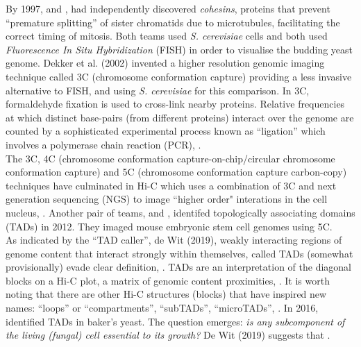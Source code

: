By 1997, \cite{guacci1997direct} and \cite{michaelis1997cohesins},
had independently discovered \textit{cohesins}, proteins that 
prevent ``premature splitting'' of sister chromatids due 
to microtubules, facilitating the correct timing of mitosis. 
Both teams used \textit{S. cerevisiae} cells and both
used \textit{Fluorescence In Situ Hybridization} (FISH) in order to visualise 
the budding yeast genome. Dekker et al. (2002) invented a higher 
resolution genomic imaging technique called 3C (chromosome conformation capture)
\cite{dekker2002capturing} providing a less invasive alternative 
to FISH, and using \textit{S. cerevisiae} for this comparison.
In 3C, formaldehyde fixation is used to cross-link nearby proteins.
Relative frequencies at which distinct base-pairs (from different proteins)
interact over the genome are counted by a sophisticated experimental
process known as ``ligation'' which involves a polymerase chain reaction (PCR),
\cite{dekker2002capturing}.
\\

The 3C, 4C (chromosome conformation capture-on-chip/circular chromosome conformation capture) and 5C 
(chromosome conformation capture carbon-copy) techniques have culminated in Hi-C which 
uses a combination of 3C and next generation sequencing (NGS) to image ``higher order" interations 
in the cell nucleus, \cite{nora2012spatial}. Another pair of teams, \cite{nora2012spatial} and 
\cite{dixon2012topological}, identifed topologically associating domains (TADs) in 2012. 
They imaged mouse embryonic stem cell genomes using 5C.
\\

As indicated by the ``TAD caller'', de Wit (2019), 
weakly interacting regions of genome content that interact strongly within themselves,
called TADs (somewhat provisionally) evade clear definition, \cite{de2020tads}.
TADs are an interpretation of the diagonal blocks on a Hi-C plot, a matrix of genomic 
content proximities, \cite{de2020tads}. It is worth noting that there are 
other Hi-C structures (blocks) that have inspired new names: ``loops'' or ``compartments'', ``subTADs'',
``microTADs'', \cite{beagan2020existence}. In 2016, \cite{eser2017form} identified TADs 
in baker's yeast. The question emerges: \textit{is any subcomponent of the living (fungal) cell essential to its
growth? } De Wit (2019) suggests that .

